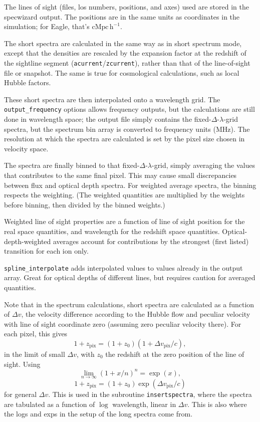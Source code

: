 \documentclass{report}
\newcommand{\param}[1]{{\tt #1}}
\begin{document}
The lines of sight (files, los numbers, positions, and axes) used are stored in the specwizard output. The positions are in the same units as coordinates in the simulation; for Eagle, that's $\mathrm{cMpc} \, \mathrm{h}^{-1}$.

The short spectra are calculated in the same way as in short spectrum mode, except that the densities are rescaled by the expansion factor at the redshift of the sightline segment (\param{acurrent}/\param{zcurrent}), rather than that of the line-of-sight file or snapshot. The same is true for cosmological calculations, such as local Hubble factors.

These short spectra are then interpolated onto a wavelength grid. The \param{output\_frequency} options allows frequency outputs, but the calculations are still done in wavelength space; the output file simply contains the fixed-$\Delta$-$\lambda$-grid spectra, but the spectrum bin array is converted to frequency units (MHz). The resolution at which the spectra are calculated is set by the pixel size chosen in velocity space.

The spectra are finally binned to that fixed-$\Delta$-$\lambda$-grid, simply averaging the values that contributes to the same final pixel. This may cause small discrepancies between flux and optical depth spectra. For weighted average spectra, the binning respects the weighting. (The weighted quantities are multiplied by the weights before binning, then divided by the binned weights.)

Weighted line of sight properties are a function of line of sight position for the real space quantities, and wavelength for the redshift space quantities. Optical-depth-weighted averages account for contributions by the strongest (first listed) transition for each ion only.

\param{spline\_interpolate} adds interpolated values to values already in the output array. Great for optical depths of different lines, but requires caution for averaged quantities.  

Note that in the spectrum calculations, short spectra are calculated as a function of $\Delta v$, the velocity difference according to the Hubble flow and peculiar velocity with line of sight coordinate zero (assuming zero peculiar velocity there).
For each pixel, this gives 
\begin{equation}
1 + z_{\mathrm{pix}} = (1 + z_{0}) (1 + \Delta v_{\mathrm{pix}} / c),
\end{equation}
in the limit of small $\Delta v$, with $z_{0}$ the redshift at the zero position of the line of sight. Using 
\begin{equation}
\lim_{n \rightarrow \infty} \left(1 + x/n \right)^{n} = \exp(x),
\end{equation}  
\begin{equation}
1 + z_{\mathrm{pix}} = (1 + z_{0}) \exp(\Delta v_{\mathrm{pix}} / c)
\end{equation}
for general $\Delta v$. This is used in the subroutine \param{insertspectra}, where the spectra are tabulated as a function of $\log$ wavelength, linear in $\Delta v$. This is also where the logs and exps in the setup of the long spectra come from.
\end{document}
